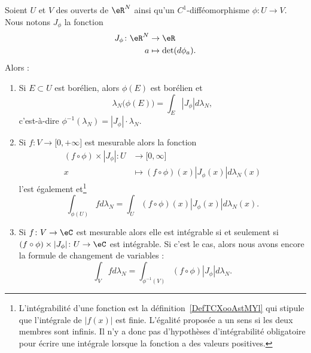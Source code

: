 \begin{theorem}         \label{THOooUMIWooZUtUSg}
    Soient \( U\) et \( V\) des ouverts de \( \eR^N\) ainsi qu'un \( C^1\)-difféomorphisme \(\phi\colon U\to V\). Nous notons \( J_{\phi}\) la fonction
    \begin{equation}
        \begin{aligned}
            J_{\phi}\colon \eR^N&\to \eR \\
            a&\mapsto \det(d\phi_a). 
        \end{aligned}
    \end{equation}
    Alors :
    \begin{enumerate}
        \item   \label{ItemVWYDooOzwnyfi}
            Si \( E\subset U\) est borélien, alors \( \phi(E)\) est borélien et
            \begin{equation}
                \lambda_N\big( \phi(E) \big)=\int_E| J_{\phi} |d\lambda_N,
            \end{equation}
            c'est-à-dire \( \phi^{-1}(\lambda_N)=| J_{\phi} |\cdot \lambda_N\).
        \item       \label{ITEMooEZUBooGBuDOS}
            Si \( f\colon V\to \mathopen[ 0 , +\infty \mathclose]\) est mesurable alors la fonction
            \begin{equation}
                \begin{aligned}
                (f\circ\phi)\times | J_{\phi} |\colon U&\to \mathopen[ 0 , \infty \mathclose]\\
                    x&\mapsto  (f\circ\phi)(x)| J_{\phi}(x) |d\lambda_N(x)
                \end{aligned}
            \end{equation}
            l'est également et\footnote{L'intégrabilité d'une fonction est la définition~\ref{DefTCXooAstMYl} qui stipule que l'intégrale de \( | f(x) |\) est finie. L'égalité proposée a un sens si les deux membres sont infinis. Il n'y a donc pas d'hypothèses d'intégrabilité obligatoire pour écrire une intégrale lorsque la fonction a des valeurs positives.}
            \begin{equation}        \label{EqRANEooQsFhbC}
                \int_{\phi(U)}fd\lambda_N=\int_U(f\circ\phi)(x)| J_{\phi}(x) |d\lambda_N(x).
            \end{equation}
        \item       \label{ITEMooAJGDooGHKnvj}
            Si \( f\colon V\to \eC\) est mesurable alors elle est intégrable si et seulement si \( (f\circ \phi)\times | J_{\phi} |\colon U\to \eC\) est intégrable. Si c'est le cas, alors nous avons encore la formule de changement de variables :
            \begin{equation}        \label{EQooLYAWooTArAZR}
                \int_{V}fd\lambda_N=\int_{\phi^{-1}(V)} (f\circ \phi)| J_{\phi} |d\lambda_N.
            \end{equation}
    \end{enumerate}
\end{theorem}


